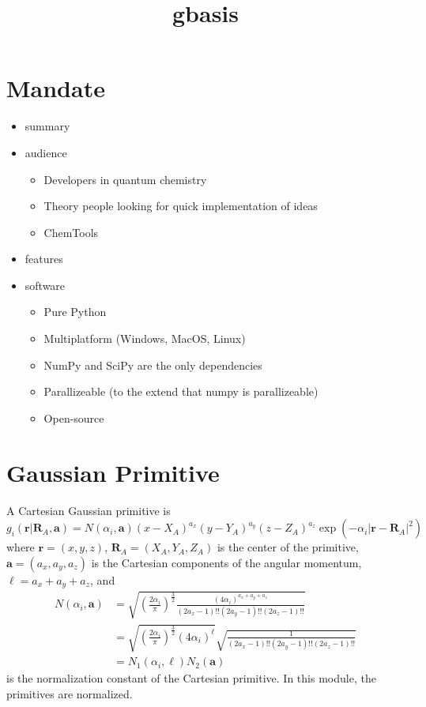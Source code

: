 \documentclass[letterpaper]{article}
\title{gbasis}
\begin{document}
\tableofcontents

\section{Mandate}
\begin{itemize}
\item summary
\item audience
  \begin{itemize}
  \item Developers in quantum chemistry
  \item Theory people looking for quick implementation of ideas
  \item ChemTools
  \end{itemize}
\item features
\item software
  \begin{itemize}
  \item Pure Python
  \item Multiplatform (Windows, MacOS, Linux)
  \item NumPy and SciPy are the only dependencies
  \item Parallizeable (to the extend that numpy is parallizeable)
  \item Open-source
  \end{itemize}
\end{itemize}

\section{Gaussian Primitive}
A Cartesian Gaussian primitive is
\begin{equation}
  \label{eq:cart_prim}
  g_i(\mathbf{r} | \mathbf{R}_A, \mathbf{a}) =
  N(\alpha_i, \mathbf{a})
  (x - X_A)^{a_x} (y - Y_A)^{a_y} (z - Z_A)^{a_z}
  \exp \left(-\alpha_i |\mathbf{r} - \mathbf{R}_A|^2 \right)
\end{equation}
where $\mathbf{r} = (x, y, z)$, $\mathbf{R}_A = (X_A, Y_A, Z_A)$ is the center
of the primitive, $\mathbf{a} = (a_x, a_y, a_z)$ is the Cartesian components of
the angular momentum, $\ell = a_x + a_y + a_z$, and
\begin{equation}
  \label{eq:cart_norm}
  \begin{split}
    N (\alpha_i, \mathbf{a}) &=
    \sqrt{
      \left(
        \frac{2 \alpha_i}{\pi}
      \right)^{\frac{3}{2}}
      \frac{(4 \alpha_i)^{a_x + a_y + a_z}}{(2 a_x -1)!! (2 a_y -1)!! (2 a_z -1)!!}
    }\\
    &= \sqrt{
      \left(
        \frac{2 \alpha_i}{\pi}
      \right)^{\frac{3}{2}}
      (4 \alpha_i)^{\ell}
    }
    \sqrt{\frac{1}{(2 a_x -1)!! (2 a_y -1)!! (2 a_z -1)!!}}\\
    &= N_1 (\alpha_i, \ell) N_2 (\mathbf{a})
  \end{split}
\end{equation}
is the normalization constant of the Cartesian primitive.
In this module, the primitives are normalized.
\end{document}
